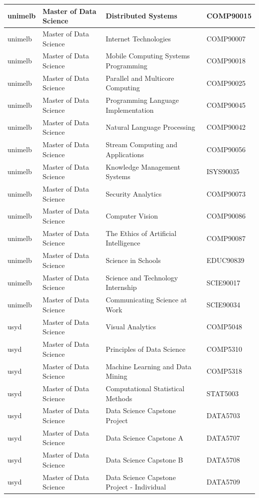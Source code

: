 \documentclass[
  letterpaper,
  DIV=11,
  numbers=noendperiod]{scrreport}
\begin{document}
\begin{table}
\begin{tabular}{l|l|l|l}
\hline
unimelb & Master of Data Science & Distributed Systems & COMP90015\\
\hline
unimelb & Master of Data Science & Internet Technologies & COMP90007\\
\hline
unimelb & Master of Data Science & Mobile Computing Systems Programming & COMP90018\\
\hline
unimelb & Master of Data Science & Parallel and Multicore Computing & COMP90025\\
\hline
unimelb & Master of Data Science & Programming Language Implementation & COMP90045\\
\hline
unimelb & Master of Data Science & Natural Language Processing & COMP90042\\
\hline
unimelb & Master of Data Science & Stream Computing and Applications & COMP90056\\
\hline
unimelb & Master of Data Science & Knowledge Management Systems & ISYS90035\\
\hline
unimelb & Master of Data Science & Security Analytics & COMP90073\\
\hline
unimelb & Master of Data Science & Computer Vision & COMP90086\\
\hline
unimelb & Master of Data Science & The Ethics of Artificial Intelligence & COMP90087\\
\hline
unimelb & Master of Data Science & Science in Schools & EDUC90839\\
\hline
unimelb & Master of Data Science & Science and Technology Internship & SCIE90017\\
\hline
unimelb & Master of Data Science & Communicating Science at Work & SCIE90034\\
\hline
usyd & Master of Data Science & Visual Analytics & COMP5048\\
\hline
usyd & Master of Data Science & Principles of Data Science & COMP5310\\
\hline
usyd & Master of Data Science & Machine Learning and Data Mining & COMP5318\\
\hline
usyd & Master of Data Science & Computational Statistical Methods & STAT5003\\
\hline
usyd & Master of Data Science & Data Science Capstone Project & DATA5703\\
\hline
usyd & Master of Data Science & Data Science Capstone A & DATA5707\\
\hline
usyd & Master of Data Science & Data Science Capstone B & DATA5708\\
\hline
usyd & Master of Data Science & Data Science Capstone Project - Individual & DATA5709\\

\end{tabular}
\end{table}
\end{document}

